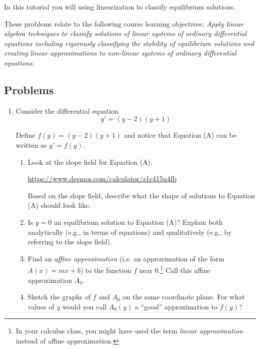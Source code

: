 \begin{objectives}
	In this tutorial you will using linearization to classify equilibrium solutions.

	These problems relate to the following course learning objectives:
	\textit{Apply linear algebra techniques to classify solutions of linear systems of ordinary differential
	equations including rigorously classifying the stability of equilibrium solutions and creating
	linear approximations to non-linear systems of ordinary differential equations}.
\end{objectives}


\subsection*{Problems}

\begin{enumerate}
	\item 	Consider the differential equation
	      \begin{equation}
		      y'=(y-2)(y+1)\tag{A}
	      \end{equation}

	      Define $f(y)=(y-2)(y+1)$ and notice that Equation (A) can be written as $y'=f(y)$.

	      \begin{enumerate}
		      \item Look at the slope field for Equation (A).

		            \url{https://www.desmos.com/calculator/z1c415u4fb}

		            Based on the slope field, describe what the shape of solutions to Equation (A) should look like.

		      \item Is $y=0$ an equilibrium solution to Equation (A)? Explain both analytically (e.g., in terms of equations)
		            and qualitatively (e.g., by referring to the slope field).
		      \item Find an \emph{affine approximation} (i.e. an approximation of the form $A(x) = m x+b$)
		            to the function $f$ near $0$.\footnote{ In your calculus class, you might have used the term
			            \emph{linear approximation} instead of affine approximation.} Call this affine approximation $A_0$.

		      \item\label{sketch} Sketch the graphs of $f$ and $A_0$ on the same coordinate plane. For what values of $y$ would you
		            call $A_0(y)$ a ``good'' approximation to $f(y)$?


\end{enumerate}
\end{enumerate}
